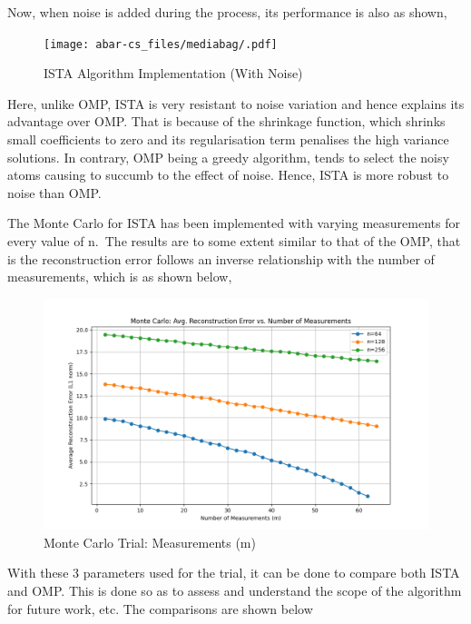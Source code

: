 \documentclass[
  letterpaper,
  DIV=11,
  numbers=noendperiod]{scrartcl}
\begin{document}
Now, when noise is added during the process, its performance is also as
shown,

\begin{figure}[H]

{\centering \texttt{[image: abar-cs\_files/mediabag/.pdf]}

}

\caption{ISTA Algorithm Implementation (With Noise)}

\end{figure}%

Here, unlike OMP, ISTA is very resistant to noise variation and hence
explains its advantage over OMP. That is because of the shrinkage
function, which shrinks small coefficients to zero and its
regularisation term penalises the high variance solutions. In contrary,
OMP being a greedy algorithm, tends to select the noisy atoms causing to
succumb to the effect of noise. Hence, ISTA is more robust to noise than
OMP.

The Monte Carlo for ISTA has been implemented with varying measurements
for every value of n.~The results are to some extent similar to that of
the OMP, that is the reconstruction error follows an inverse
relationship with the number of measurements, which is as shown below,

\begin{figure}[H]

{\centering \includegraphics[width=0.8\linewidth,height=\textheight,keepaspectratio]{abar-cs_files/mediabag/istaa-montecarlo.png}

}

\caption{Monte Carlo Trial: Measurements (m)}

\end{figure}%

With these 3 parameters used for the trial, it can be done to compare
both ISTA and OMP. This is done so as to assess and understand the scope
of the algorithm for future work, etc. The comparisons are shown below
\end{document}
